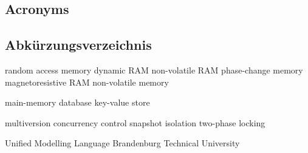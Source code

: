 %
%
%
%
\begin{en}
\chapter{Acronyms}
\end{en}
\begin{de}
\chapter{Abk\"urzungsverzeichnis}
\end{de}
\label{sec:acronyms}
%
\begin{multicols}{2}
\begin{acronym}[NVRAM]		%

	 {random access memory}
	 {dynamic RAM}
	 {non-volatile RAM}
	 {phase-change memory}
	 {magnetoresistive RAM}
	 {non-volatile memory}

     {main-memory database}
     {key-value store}

     {multiversion concurrency control}
     {snapshot isolation}
     {two-phase locking}

	 {Unified Modelling Language}
	 {Brandenburg Technical University}

\end{acronym}
\end{multicols}
%
%
